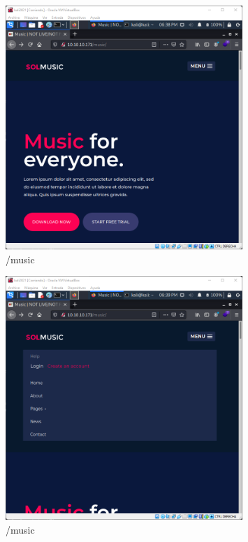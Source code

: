 \documentclass{article}
\begin{document}
\begin{figure}[h]
	\center
	\includegraphics[width=0.8\textwidth]{images/openadmin/4-music.png}
	\caption{/music}
\end{figure}

\begin{figure}[h]
	\center
	\includegraphics[width=0.8\textwidth]{images/openadmin/4-musicdetalles.png}
	\caption{/music}
\end{figure}
\end{document}
